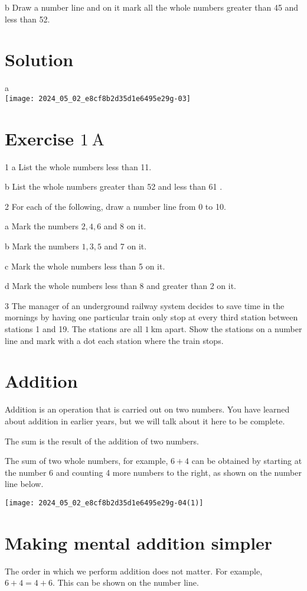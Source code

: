 \documentclass[10pt]{article}
\begin{document}
b Draw a number line and on it mark all the whole numbers greater than 45 and less than 52.

\section*{Solution}
a\\
\texttt{[image: 2024\_05\_02\_e8cf8b2d35d1e6495e29g-03]}

\section*{Exercise \(1 \mathrm{~A}\)}
1 a List the whole numbers less than 11.

b List the whole numbers greater than 52 and less than 61 .

2 For each of the following, draw a number line from 0 to 10.

a Mark the numbers \(2,4,6\) and 8 on it.

b Mark the numbers \(1,3,5\) and 7 on it.

c Mark the whole numbers less than 5 on it.

d Mark the whole numbers less than 8 and greater than 2 on it.

3 The manager of an underground railway system decides to save time in the mornings by having one particular train only stop at every third station between stations 1 and 19. The stations are all \(1 \mathrm{~km}\) apart. Show the stations on a number line and mark with a dot each station where the train stops.

\section*{Addition}
Addition is an operation that is carried out on two numbers. You have learned about addition in earlier years, but we will talk about it here to be complete.

The sum is the result of the addition of two numbers.

The sum of two whole numbers, for example, \(6+4\) can be obtained by starting at the number 6 and counting 4 more numbers to the right, as shown on the number line below.

\begin{center}
\texttt{[image: 2024\_05\_02\_e8cf8b2d35d1e6495e29g-04(1)]}
\end{center}

\section*{Making mental addition simpler}
The order in which we perform addition does not matter. For example, \(6+4=4+6\). This can be shown on the number line.
\end{document}
